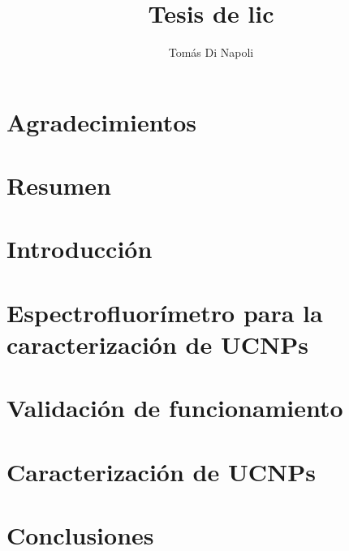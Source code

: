 \documentclass[12pt]{report}
\title{Tesis de lic}
\author{Tomás Di Napoli}
\begin{document}
\maketitle


\chapter*{Agradecimientos}

\chapter*{Resumen}

\tableofcontents


\chapter{Introducción}


\chapter{Espectrofluorímetro para la caracterización de UCNPs}


\chapter{Validación de funcionamiento}


\chapter{Caracterización de UCNPs}


\chapter{Conclusiones}






\begin{appendices}

\end{appendices}
\end{document}
